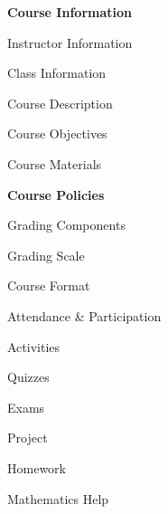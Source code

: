 \documentclass[11pt,letterpaper]{article}
\begin{document}
\mytitle




\begin{minipage}[t]{0.45\textwidth}
{\bfseries\color{stacred} Course Information} \dotfill \pageref{course_info} \par
\hspace{0.3cm} Instructor Information \dotfill \pageref{instr_info} \par
\hspace{0.3cm} Class Information \dotfill \pageref{class_info} \par
\hspace{0.3cm} Course Description \dotfill \pageref{course_desc} \par
\hspace{0.3cm} Course Objectives \dotfill \pageref{course_obj} \par
\hspace{0.3cm} Course Materials \dotfill \pageref{course_mat} \par
{\bfseries\color{stacred} Course Policies} \dotfill \pageref{course_polc} \par
\hspace{0.3cm} Grading Components \dotfill \pageref{grade_comp} \par
\hspace{0.3cm} Grading Scale \dotfill \pageref{grade_scale} \par
\hspace{0.3cm} Course Format \dotfill \pageref{course_form} \par
\hspace{0.3cm} Attendance \& Participation \dotfill \pageref{attend} \par
\hspace{0.3cm} Activities \dotfill \pageref{act} \par
\hspace{0.3cm} Quizzes \dotfill \pageref{quiz} \par
\hspace{0.3cm} Exams \dotfill \pageref{exams} \par
\hspace{0.3cm} Project \dotfill \pageref{project} \par
\hspace{0.3cm} Homework \dotfill \pageref{hw} \par
\hspace{0.3cm} Mathematics Help \dotfill \pageref{help} \par

\end{minipage}
\end{document}
